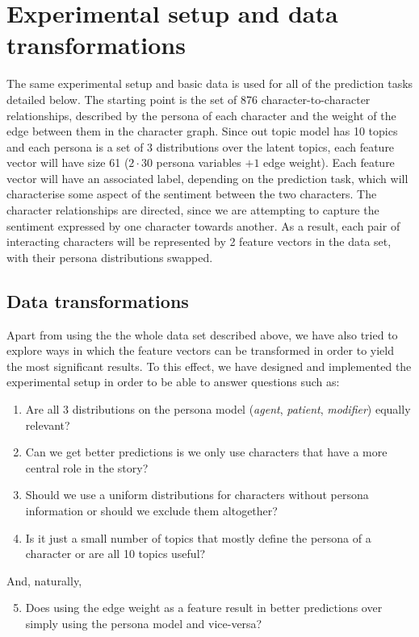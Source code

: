 \documentclass[bsc,frontabs,singlespacing,parskip]{infthesis} %
\begin{document}
\section{Experimental setup and data transformations}
The same experimental setup and basic data is used for all of the prediction tasks detailed below. The starting point is the set of 876 character-to-character relationships, described by the persona of each character and the weight of the edge between them in the character graph. Since out topic model has 10 topics and each persona is a set of 3 distributions over the latent topics, each feature vector will have size 61 ($2 \cdot 30$ persona variables $+ 1$ edge weight). Each feature vector will have an associated label, depending on the prediction task, which will characterise some aspect of the sentiment between the two characters. The character relationships are directed, since we are attempting to capture the sentiment expressed by one character towards another. As a result, each pair of interacting characters will be represented by 2 feature vectors in the data set, with their persona distributions swapped.

\subsection{Data transformations}
Apart from using the the whole data set described above, we have also tried to explore ways in which the feature vectors can be transformed in order to yield the most significant results. To this effect, we have designed and implemented the experimental setup in order to be able to answer questions such as:
\begin{enumerate}
	\item Are all 3 distributions on the persona model (\textit{agent}, \textit{patient}, \textit{modifier}) equally relevant?
	\item Can we get better predictions is we only use characters that have a more central role in the story?
	\item Should we use a uniform distributions for characters without persona information or should we exclude them altogether?
	\item Is it just a small number of topics that mostly define the persona of a character or are all 10 topics useful?
\end{enumerate}
And, naturally,
\begin{enumerate}
	\setcounter{enumi}{4}
	\item Does using the edge weight as a feature result in better predictions over simply using the persona model and vice-versa?
\end{enumerate}
\end{document}
